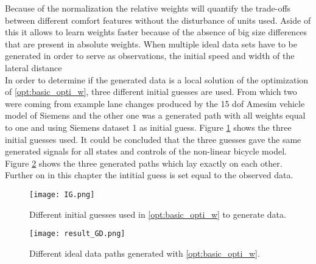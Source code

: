 Because of the normalization the relative weights will quantify the trade-offs between different comfort features without the disturbance of units used. Aside of this it allows to learn weights faster because of the absence of big size differences that are present in absolute weights. When multiple ideal data sets have to be generated in order to serve as observations, the initial speed and width of the lateral distance \\
In order to determine if the generated data is a local solution of the optimization of \ref{opt:basic_opti_w}, three different initial guesses are used. From which two were coming from example lane changes produced by the 15 dof Amesim vehicle model of Siemens and the other one was a generated path with all weights equal to one and using Siemens dataset 1 as initial guess. Figure \ref{fig:IG} shows the three initial guesses used. It could be concluded that the three guesses gave the same generated signals for all states and controls of the non-linear bicycle model. Figure \ref{fig:result_GD} shows the three generated paths which lay exactly on each other. Further on in this chapter the intitial guess is set equal to the observed data.

\begin{figure}[h!]
	\centering
	\texttt{[image: IG.png]}
	\caption{Different initial guesses used in \ref{opt:basic_opti_w} to generate data.}
	\label{fig:IG}
\end{figure}

\begin{figure}[h!]
	\centering
	\texttt{[image: result\_GD.png]}
	\caption{Different ideal data paths generated with \ref{opt:basic_opti_w}.}
	\label{fig:result_GD}
\end{figure}

